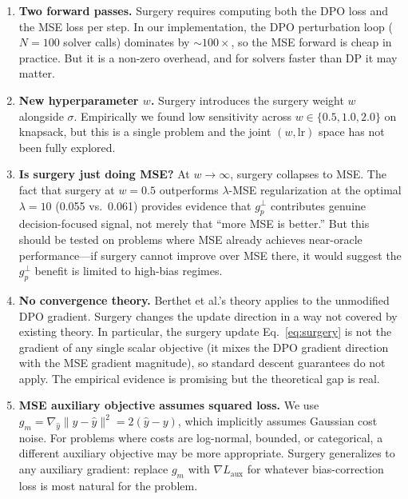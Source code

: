 \documentclass[11pt]{article}
\begin{document}
\begin{enumerate}[itemsep=8pt]

  \item \textbf{Two forward passes.}  Surgery requires computing both the DPO
        loss and the MSE loss per step.  In our implementation, the DPO
        perturbation loop ($N = 100$ solver calls) dominates by $\sim 100\times$,
        so the MSE forward is cheap in practice.  But it is a non-zero overhead,
        and for solvers faster than DP it may matter.

  \item \textbf{New hyperparameter $w$.}  Surgery introduces the surgery weight
        $w$ alongside $\sigma$.  Empirically we found low sensitivity across
        $w \in \{0.5, 1.0, 2.0\}$ on knapsack, but this is a single problem and
        the joint $(w, \mathrm{lr})$ space has not been fully explored.

  \item \textbf{Is surgery just doing MSE?}  At $w \to \infty$, surgery collapses
        to MSE.  The fact that surgery at $w = 0.5$ outperforms $\lambda$-MSE
        regularization at the optimal $\lambda = 10$ (0.055 vs.\ 0.061) provides
        evidence that $g_p^{\perp}$ contributes genuine decision-focused signal,
        not merely that ``more MSE is better.''  But this should be tested on
        problems where MSE already achieves near-oracle performance---if surgery
        cannot improve over MSE there, it would suggest the $g_p^{\perp}$ benefit
        is limited to high-bias regimes.

  \item \textbf{No convergence theory.}  Berthet et al.'s theory applies to the
        unmodified DPO gradient.  Surgery changes the update direction in a way
        not covered by existing theory.  In particular, the surgery update
        Eq.~\eqref{eq:surgery} is not the gradient of any single scalar objective
        (it mixes the DPO gradient direction with the MSE gradient magnitude),
        so standard descent guarantees do not apply.  The empirical evidence is
        promising but the theoretical gap is real.

  \item \textbf{MSE auxiliary objective assumes squared loss.}  We use
        $g_m = \nabla_{\hat{y}} \|y - \hat{y}\|^2 = 2(\hat{y} - y)$, which
        implicitly assumes Gaussian cost noise.  For problems where costs are
        log-normal, bounded, or categorical, a different auxiliary objective may
        be more appropriate.  Surgery generalizes to any auxiliary gradient:
        replace $g_m$ with $\nabla L_{\mathrm{aux}}$ for whatever bias-correction
        loss is most natural for the problem.


\end{enumerate}
\end{document}

